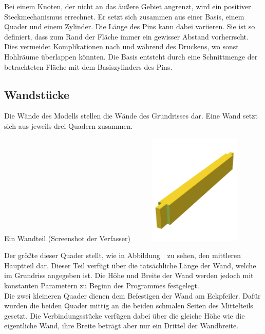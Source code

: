 Bei einem Knoten, der nicht an das äußere Gebiet angrenzt, wird ein positiver Steckmechanismus errechnet.
Er setzt sich zusammen aus einer Basis, einem Quader und einem Zylinder.
Die Länge des Pins kann dabei variieren.
Sie ist so definiert, dass zum Rand der Fläche immer ein gewisser Abstand vorherrscht.
Dies vermeidet Komplikationen nach und während des Druckens, wo sonst Hohlräume überlappen könnten.
Die Basis entsteht durch eine Schnittmenge der betrachteten Fläche mit dem Basiszylinders des Pins.\\

\subsection{Wandstücke}
Die Wände des Modells stellen die Wände des Grundrisses dar.
Eine Wand setzt sich aus jeweils drei Quadern zusammen. 
\begin{Bild}{Ein Wandteil (Screenshot der Verfasser)}
	\includegraphics[height=200px, width=240px]{Bilder/Untereinheit_Wand}
\end{Bild}
Der größte dieser Quader stellt, wie in Abbildung~\thebildnr\ zu sehen, den mittleren Hauptteil dar.
Dieser Teil verfügt über die tatsächliche Länge der Wand, welche im Grundriss angegeben ist.
Die Höhe und Breite der Wand werden jedoch mit konstanten Parametern zu Beginn des Programmes festgelegt. \\
Die zwei kleineren Quader dienen dem Befestigen der Wand am Eckpfeiler.
Dafür wurden die beiden Quader mittig an die beiden schmalen Seiten des Mittelteils gesetzt.
Die Verbindungsstücke verfügen dabei über die gleiche Höhe wie die eigentliche Wand, ihre Breite beträgt aber nur ein Drittel der Wandbreite.\\

